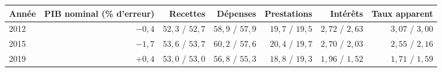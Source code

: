\begin{tabular}{lrrrrrr}\toprule Année & PIB nominal (\% d'erreur) & Recettes & Dépenses & Prestations & Intérêts & Taux apparent\\ \midrule
2012 & $-0{,}4$ & $52{,}3$ / $52{,}7$ & $58{,}9$ / $57{,}9$ & $19{,}7$ / $19{,}5$ & $2{,}72$ / $2{,}63$ & $3{,}07$ / $3{,}00$\\
2015 & $-1{,}7$ & $53{,}6$ / $53{,}7$ & $60{,}2$ / $57{,}6$ & $20{,}4$ / $19{,}7$ & $2{,}70$ / $2{,}03$ & $2{,}55$ / $2{,}16$\\
2019 & $+0{,}4$ & $53{,}0$ / $53{,}0$ & $56{,}8$ / $55{,}3$ & $18{,}8$ / $19{,}3$ & $1{,}96$ / $1{,}52$ & $1{,}71$ / $1{,}59$\\\bottomrule\end{tabular}